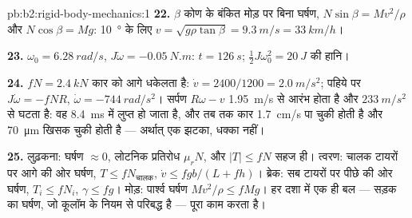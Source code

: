 \begin{solution}{pb:b2:rigid-body-mechanics:1}
\textbf{22.} $\beta$ कोण के बंकित मोड़ पर बिना घर्षण,
$N\sin\beta =
Mv^2/\rho$ और $N\cos\beta = Mg$: \qty{10}{\degree} के लिए
$v = \sqrt{g\rho\tan\beta} = \qty{9.3}{m/s} =
\qty{33}{km/h}$।

\textbf{23.} $\omega_0 = \qty{6.28}{rad/s}$,
$J\dot\omega = \qty{-0.05}{N.m}$: $t =
\qty{126}{s}$;
$\tfrac12J\omega_0^2 = \qty{20}{J}$ की हानि।

\textbf{24.}  $fN = \qty{2.4}{kN}$ कार को आगे धकेलता है:
$\dot v = 2400/1200 = \qty{2.0}{m/s^2}$; पहिये पर $J\dot\omega = -fNR$,
$\dot\omega = \qty{-744}{rad/s^2}$। सर्पण $R\omega - v$ \qty{1.95}{m/s} से
आरंभ होता है
और $\qty{233}{m/s^2}$ से घटता है: वह \qty{8.4}{ms} में लुप्त हो जाता है, और
तब तक कार
\qty{1.7}{cm/s} पा चुकी होती है और \qty{70}{\micro m} खिसक चुकी होती है ---
अर्थात् एक झटका, धक्का नहीं।

\textbf{25.} लुढ़कना: घर्षण $\approx 0$, लोटनिक प्रतिरोध $\mu_rN$,
और $|T| \le fN$ सहज ही। त्वरण: चालक टायरों पर आगे की ओर घर्षण,
$T \le fN_{\text{चालक}}$, $\dot v \le fgb/(L + fh)$। ब्रेक:
सब टायरों पर पीछे की ओर घर्षण, $T_i \le fN_i$, $\gamma \le fg$।
मोड़: पार्श्व घर्षण $Mv^2/\rho \le fMg$। हर दशा में एक ही
बल --- सड़क का घर्षण, जो कूलॉम के नियम से परिबद्ध है --- पूरा
काम करता है।
\end{solution}
